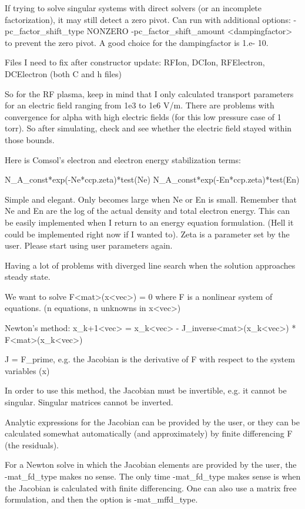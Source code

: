 If trying to solve singular systems with direct solvers (or an incomplete factorization), it may still detect a zero pivot. Can run with additional options: -pc_factor_shift_type NONZERO -pc_factor_shift_amount <dampingfactor> to prevent the zero pivot. A good choice for the dampingfactor is 1.e-
10.

Files I need to fix after constructor update: RFIon, DCIon, RFElectron, DCElectron (both C and h files)

So for the RF plasma, keep in mind that I only calculated transport parameters for an electric field ranging from 1e3 to 1e6 V/m. There are problems with convergence for alpha with high electric fields (for this low pressure case of 1 torr). So after simulating, check and see whether the electric field stayed within those bounds.

Here is Comsol's electron and electron energy stabilization terms:

N_A_const*exp(-Ne*ccp.zeta)*test(Ne)
N_A_const*exp(-En*ccp.zeta)*test(En)

Simple and elegant. Only becomes large when Ne or En is small. Remember that Ne and En are the log of the actual density and total electron energy. This can be easily implemented when I return to an energy equation formulation. (Hell it could be implemented right now if I wanted to). Zeta is a parameter set by the user. Please start using user parameters again.

Having a lot of problems with diverged line search when the solution approaches steady state.

We want to solve F<mat>(x<vec>) = 0 where F is a nonlinear system of equations. (n equations, n unknowns in x<vec>)

Newton's method: x_k+1<vec> = x_k<vec> - J_inverse<mat>(x_k<vec>) * F<mat>(x_k<vec>)

J = F_prime, e.g. the Jacobian is the derivative of F with respect to the system variables (x)

In order to use this method, the Jacobian must be invertible, e.g. it cannot be singular. Singular matrices cannot be inverted.

Analytic expressions for the Jacobian can be provided by the user, or they can be calculated somewhat automatically (and approximately) by finite differencing F (the residuals).

For a Newton solve in which the Jacobian elements are provided by the user, the -mat_fd_type makes no sense. The only time -mat_fd_type makes sense is when the Jacobian is calculated with finite differencing. One can also use a matrix free formulation, and then the option is -mat_mffd_type.

